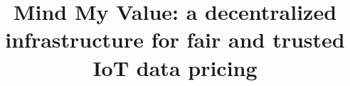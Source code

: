 \documentclass[chi_draft]{sigchi}
\begin{document}
%
\title{Mind My Value: a decentralized infrastructure for fair and trusted IoT data pricing}



\emptyauthor


\maketitle
\end{document}
